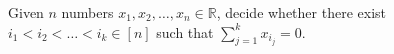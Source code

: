 \begin{problem}[\(k\)-SUM]
	Given \(n\) numbers \(x_1, x_2, \ldots, x_n \in \mathbb{R}\), decide
	whether there exist \(i_1 < i_2 < \ldots < i_k \in [n]\) such that
	\(\sum_{j=1}^k x_{i_j} = 0\).
\end{problem}
